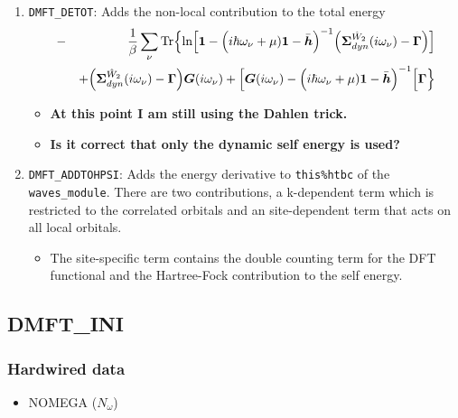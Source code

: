 \documentclass[11pt,a4paper]{report}
\begin{document}
\begin{enumerate}
%
\item \verb|DMFT_DETOT|: Adds the non-local contribution to the total energy
\begin{eqnarray}
&-&\frac{1}{\beta}\sum_\nu\mathrm{Tr}\Bigl\lbrace
\ln\Bigl[
\bm{1}-
\Bigl(i\hbar\omega_\nu+\mu)\bm{1}-\bar{\bm{h}}\Bigr)^{-1}
\Bigl(
\bm{\Sigma}^{\hat{W}_2}_{dyn}(i\omega_\nu)-\bm{\Gamma}\Bigr)
\Bigr]
\nonumber\\&&
+\Bigl(\bm{\Sigma}^{\hat{W}_2}_{dyn}(i\omega_\nu)
-\bm{\Gamma}\Bigr)\bm{G}(i\omega_\nu)
+
\Bigl[
\bm{G}(i\omega_\nu)
-\Bigl(i\hbar\omega_\nu+\mu)\bm{1}-\bar{\bm{h}}\Bigr)^{-1}
\Bigr[
\bm{\Gamma}\Bigr\rbrace
\end{eqnarray}
\begin{itemize}
  \item \textbf{At this point I am still using the Dahlen trick.}  
  \item \textbf{Is it correct that only the dynamic self energy is used?}
\end{itemize}
%
\item \verb|DMFT_ADDTOHPSI|: Adds the energy derivative to
  \verb|this%htbc| of the \verb|waves_module|. There are two
  contributions, a k-dependent term which is restricted to the
  correlated orbitals and an site-dependent term that acts on all
  local orbitals.
\begin{itemize}
\item The site-specific term contains the double counting term for the
  DFT functional and the Hartree-Fock contribution to the self energy.
\end{itemize}
\end{enumerate}



\subsection{DMFT\_INI}

\subsubsection{Hardwired data}
\begin{itemize}
\item NOMEGA ($N_\omega$)
\end{itemize}
\end{document}
